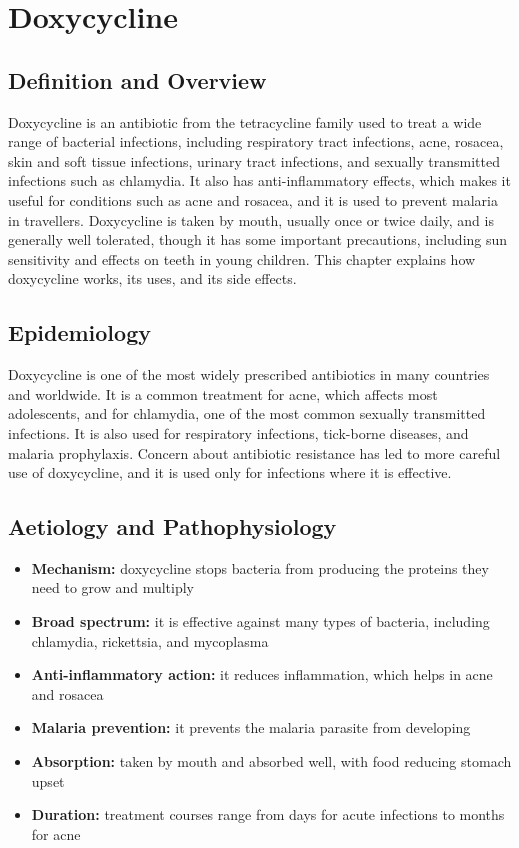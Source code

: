 \chapter{Doxycycline}

\section*{Definition and Overview}
Doxycycline is an antibiotic from the tetracycline family used to treat a wide range of bacterial infections, including respiratory tract infections, acne, rosacea, skin and soft tissue infections, urinary tract infections, and sexually transmitted infections such as chlamydia. It also has anti-inflammatory effects, which makes it useful for conditions such as acne and rosacea, and it is used to prevent malaria in travellers. Doxycycline is taken by mouth, usually once or twice daily, and is generally well tolerated, though it has some important precautions, including sun sensitivity and effects on teeth in young children. This chapter explains how doxycycline works, its uses, and its side effects.

\section*{Epidemiology}
Doxycycline is one of the most widely prescribed antibiotics in many countries and worldwide. It is a common treatment for acne, which affects most adolescents, and for chlamydia, one of the most common sexually transmitted infections. It is also used for respiratory infections, tick-borne diseases, and malaria prophylaxis. Concern about antibiotic resistance has led to more careful use of doxycycline, and it is used only for infections where it is effective.

\section*{Aetiology and Pathophysiology}
\begin{itemize}
    \item \textbf{Mechanism:} doxycycline stops bacteria from producing the proteins they need to grow and multiply
    \item \textbf{Broad spectrum:} it is effective against many types of bacteria, including chlamydia, rickettsia, and mycoplasma
    \item \textbf{Anti-inflammatory action:} it reduces inflammation, which helps in acne and rosacea
    \item \textbf{Malaria prevention:} it prevents the malaria parasite from developing
    \item \textbf{Absorption:} taken by mouth and absorbed well, with food reducing stomach upset
    \item \textbf{Duration:} treatment courses range from days for acute infections to months for acne
\end{itemize}

